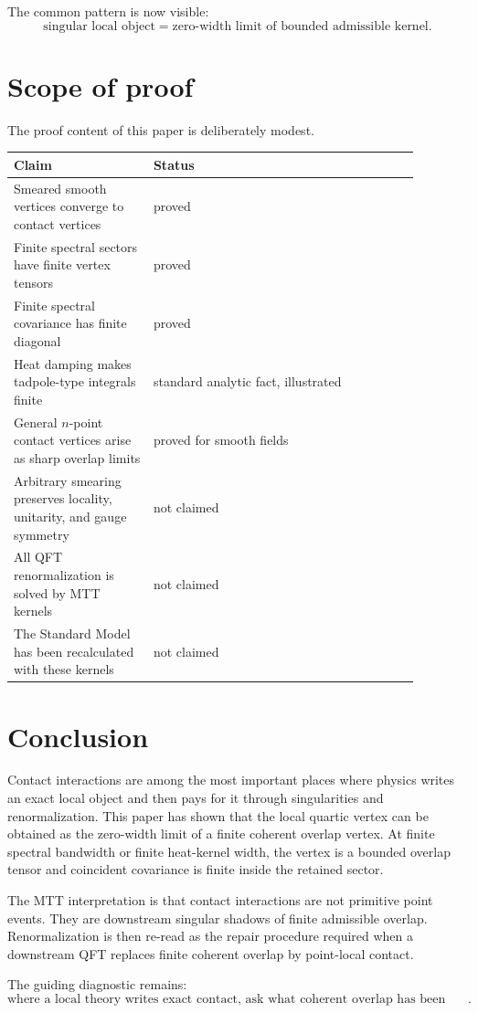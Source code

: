 \documentclass[11pt]{article}
\begin{document}
The common pattern is now visible:
\[
\boxed{\text{singular local object}=\text{zero-width limit of bounded admissible kernel}.}
\]

\section{Scope of proof}

The proof content of this paper is deliberately modest.

\begin{center}
\begin{tabular}{p{0.30\linewidth}p{0.58\linewidth}}
\hline
\textbf{Claim} & \textbf{Status}\\
\hline
Smeared smooth vertices converge to contact vertices & proved\\
Finite spectral sectors have finite vertex tensors & proved\\
Finite spectral covariance has finite diagonal & proved\\
Heat damping makes tadpole-type integrals finite & standard analytic fact, illustrated\\
General \(n\)-point contact vertices arise as sharp overlap limits & proved for smooth fields\\
Arbitrary smearing preserves locality, unitarity, and gauge symmetry & not claimed\\
All QFT renormalization is solved by MTT kernels & not claimed\\
The Standard Model has been recalculated with these kernels & not claimed\\
\hline
\end{tabular}
\end{center}

\section{Conclusion}

Contact interactions are among the most important places where physics writes an exact local
object and then pays for it through singularities and renormalization.  This paper has shown
that the local quartic vertex can be obtained as the zero-width limit of a finite coherent
overlap vertex.  At finite spectral bandwidth or finite heat-kernel width, the vertex is a
bounded overlap tensor and coincident covariance is finite inside the retained sector.

The MTT interpretation is that contact interactions are not primitive point events.  They are
downstream singular shadows of finite admissible overlap.  Renormalization is then re-read as
the repair procedure required when a downstream QFT replaces finite coherent overlap by
point-local contact.

The guiding diagnostic remains:
\[
\boxed{\text{where a local theory writes exact contact, ask what coherent overlap has been collapsed}.}
\]
\end{document}
